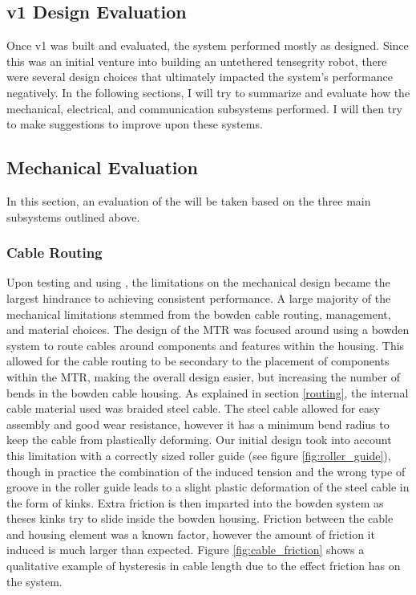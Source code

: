 \begin{appendices}
\chapter{\SB{} v1 Design Evaluation}
\label{app:evalutation}

Once \SB{} v1 was built and evaluated, the system performed mostly as designed.
Since this was an initial venture into building an untethered tensegrity robot, there were several design choices that ultimately impacted the system's performance negatively.
In the following sections, I will try to summarize and evaluate how the mechanical, electrical, and communication subsystems performed.
I will then try to make suggestions to improve upon these systems.

\section{Mechanical Evaluation}

In this section, an evaluation of the \SB{} will be taken based on the three main subsystems outlined above.

\subsection{Cable Routing}
Upon testing and using \SB{}, the limitations on the mechanical design became the largest hindrance to achieving consistent performance.
A large majority of the mechanical limitations stemmed from the bowden cable routing, management, and material choices.
The design of the MTR was focused around using a bowden system to route cables around components and features within the housing.
This allowed for the cable routing to be secondary to the placement of components within the MTR, making the overall design easier, but increasing the number of bends in the bowden cable housing.
As explained in section \ref{routing}, the internal cable material used was braided steel cable.
The steel cable allowed for easy assembly and good wear resistance, however it has a minimum bend radius to keep the cable from plastically deforming.
Our initial design took into account this limitation with a correctly sized roller guide (see figure \ref{fig:roller_guide}), though in practice the combination of the induced tension and the wrong type of groove in the roller guide leads to a slight plastic deformation of the steel cable in the form of kinks.
Extra friction is then imparted into the bowden system as theses kinks try to slide inside the bowden housing.
Friction between the cable and housing element was a known factor, however the amount of friction it induced is much larger than expected.
Figure \ref{fig:cable_friction} shows a qualitative example of hysteresis in cable length due to the effect friction has on the system.


\end{appendices}
